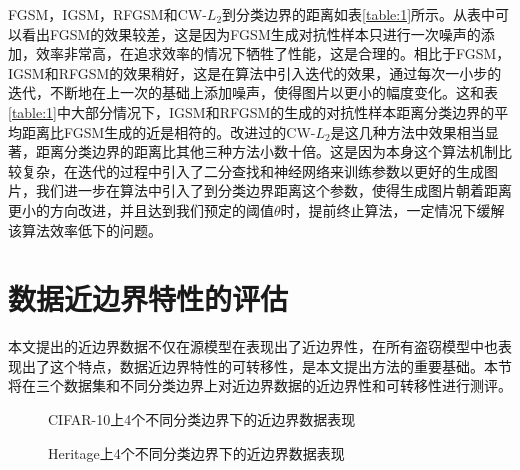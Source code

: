 FGSM，IGSM，RFGSM和CW-$L_2$到分类边界的距离如表\ref{table:1}所示。从表中可以看出FGSM的效果较差，这是因为FGSM生成对抗性样本只进行一次噪声的添加，效率非常高，在追求效率的情况下牺牲了性能，这是合理的。相比于FGSM，IGSM和RFGSM的效果稍好，这是在算法中引入迭代的效果，通过每次一小步的迭代，不断地在上一次的基础上添加噪声，使得图片以更小的幅度变化。这和表\ref{table:1}中大部分情况下，IGSM和RFGSM的生成的对抗性样本距离分类边界的平均距离比FGSM生成的近是相符的。改进过的CW-$L_2$是这几种方法中效果相当显著，距离分类边界的距离比其他三种方法小数十倍。这是因为本身这个算法机制比较复杂，在迭代的过程中引入了二分查找和神经网络来训练参数以更好的生成图片，我们进一步在算法中引入了到分类边界距离这个参数，使得生成图片朝着距离更小的方向改进，并且达到我们预定的阈值$\theta$时，提前终止算法，一定情况下缓解该算法效率低下的问题。


\section{数据近边界特性的评估}\label{5.3}

本文提出的近边界数据不仅在源模型在表现出了近边界性，在所有盗窃模型中也表现出了这个特点，数据近边界特性的可转移性，是本文提出方法的重要基础。本节将在三个数据集和不同分类边界上对近边界数据的近边界性和可转移性进行测评。

\begin{figure}[!htb]
	\centering
	\caption{CIFAR-10上4个不同分类边界下的近边界数据表现}
	\label{CIFAR-10上不同分类边界下的近边界数据表现}
\end{figure}

\begin{figure}[!htb]
	\centering
	\caption{Heritage上4个不同分类边界下的近边界数据表现}
	\label{Heritage上不同分类边界下的近边界数据表现}
\end{figure}

